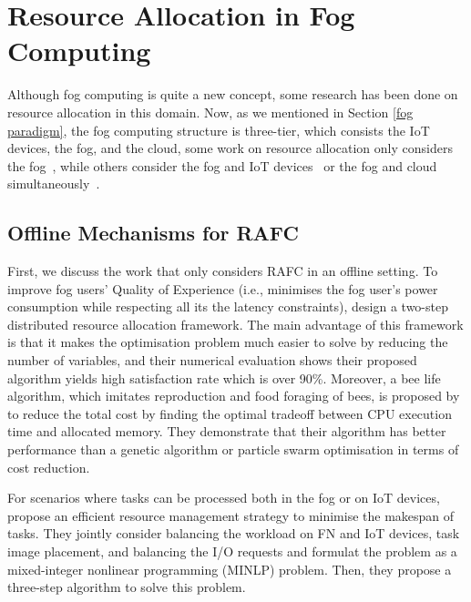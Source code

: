 \documentclass[11pt]{phdthesis}
\begin{document}
\section{Resource Allocation in Fog Computing} \label{resource-allocation-in-fog-computing}
Although fog computing is quite a new concept, some research has been done on resource allocation in this domain. Now, as we mentioned in Section \ref{fog paradigm}, the fog computing structure is three-tier, which consists the IoT devices, the fog, and the cloud, some work on resource allocation only considers the fog~\citep{oueis2015fog,aazam2015fog}, while others consider the fog and IoT devices~\citep{zeng2016joint} or the fog and cloud simultaneously~\citep{deng2015towards,agarwal2016efficient}.

\subsection{Offline Mechanisms for RAFC}

First, we discuss the work that only considers RAFC in an offline setting. To improve fog users' Quality of Experience (i.e., minimises the fog user's power consumption while respecting all its the latency constraints), \citet{oueis2015fog} design a two-step distributed resource allocation framework. The main advantage of this framework is that it makes the optimisation problem much easier to solve by reducing the number of variables, and their numerical evaluation shows their proposed algorithm yields high satisfaction rate which is over 90\%. Moreover, a bee life algorithm, which imitates reproduction and food foraging of bees, is proposed by \citet{bitam2018fog} to reduce the total cost by finding the optimal tradeoff between CPU execution time and allocated memory. They demonstrate that their algorithm has better performance than a genetic algorithm or particle swarm optimisation in terms of cost reduction. 

For scenarios where tasks can be processed both in the fog or on IoT devices, \citet{zeng2016joint} propose an efficient resource management strategy to minimise the makespan of tasks. They jointly consider balancing the workload on FN and IoT devices, task image placement, and balancing the I/O requests and formulat the problem as a mixed-integer nonlinear programming (MINLP) problem. Then, they propose a three-step algorithm to solve this problem. 
\end{document}

